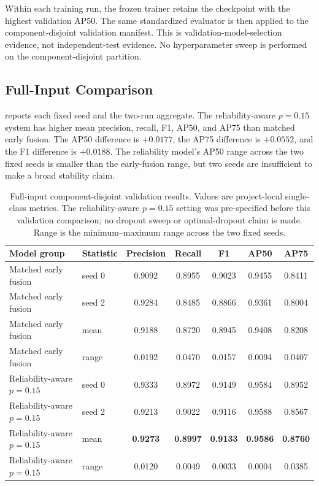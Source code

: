 Within each training run, the frozen trainer retains the checkpoint with the highest validation AP50. The same standardized evaluator is then applied to the component-disjoint validation manifest. This is validation-model-selection evidence, not independent-test evidence. No hyperparameter sweep is performed on the component-disjoint partition.

\subsection{Full-Input Comparison}
 reports each fixed seed and the two-run aggregate. The reliability-aware $p=0.15$ system has higher mean precision, recall, F1, AP50, and AP75 than matched early fusion. The AP50 difference is $+0.0177$, the AP75 difference is $+0.0552$, and the F1 difference is $+0.0188$. The reliability model's AP50 range across the two fixed seeds is smaller than the early-fusion range, but two seeds are insufficient to make a broad stability claim.

\begin{table}[t]
\centering
\caption{Full-input component-disjoint validation results. Values are project-local single-class metrics. The reliability-aware $p=0.15$ setting was pre-specified before this validation comparison; no dropout sweep or optimal-dropout claim is made. Range is the minimum--maximum range across the two fixed seeds.}
\label{tab:core}
\scriptsize
\begin{tabular}{@{}llccccc@{}}
\toprule
Model group & Statistic & Precision & Recall & F1 & AP50 & AP75\\
\midrule
Matched early fusion & seed 0 & 0.9092 & 0.8955 & 0.9023 & 0.9455 & 0.8411\\
Matched early fusion & seed 2 & 0.9284 & 0.8485 & 0.8866 & 0.9361 & 0.8004\\
Matched early fusion & mean & 0.9188 & 0.8720 & 0.8945 & 0.9408 & 0.8208\\
Matched early fusion & range & 0.0192 & 0.0470 & 0.0157 & 0.0094 & 0.0407\\
\midrule
Reliability-aware $p=0.15$ & seed 0 & 0.9333 & 0.8972 & 0.9149 & 0.9584 & 0.8952\\
Reliability-aware $p=0.15$ & seed 2 & 0.9213 & 0.9022 & 0.9116 & 0.9588 & 0.8567\\
Reliability-aware $p=0.15$ & mean & \textbf{0.9273} & \textbf{0.8997} & \textbf{0.9133} & \textbf{0.9586} & \textbf{0.8760}\\
Reliability-aware $p=0.15$ & range & 0.0120 & 0.0049 & 0.0033 & 0.0004 & 0.0385\\
\bottomrule
\end{tabular}
\end{table}

